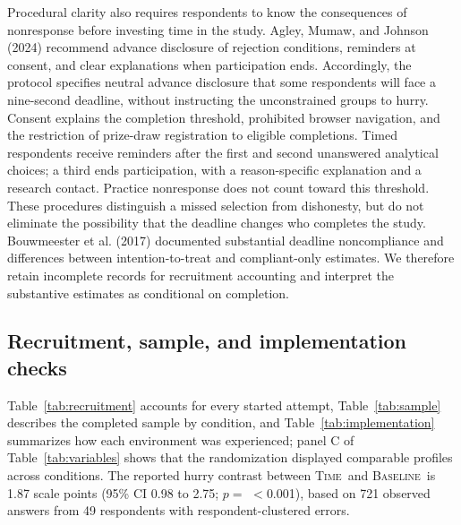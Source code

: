 \documentclass[11pt]{article}\usepackage[]{graphicx}\usepackage[]{xcolor}
\newcommand{\armT}{\textsc{Time}}
\newcommand{\armB}{\textsc{Baseline}}
\begin{document}
Procedural clarity also requires respondents to know the consequences of nonresponse before investing time in the study. Agley, Mumaw, and Johnson (2024) recommend advance disclosure of rejection conditions, reminders at consent, and clear explanations when participation ends. Accordingly, the protocol specifies neutral advance disclosure that some respondents will face a nine-second deadline, without instructing the unconstrained groups to hurry. Consent explains the completion threshold, prohibited browser navigation, and the restriction of prize-draw registration to eligible completions. Timed respondents receive reminders after the first and second unanswered analytical choices; a third ends participation, with a reason-specific explanation and a research contact. Practice nonresponse does not count toward this threshold. These procedures distinguish a missed selection from dishonesty, but do not eliminate the possibility that the deadline changes who completes the study. Bouwmeester et al. (2017) documented substantial deadline noncompliance and differences between intention-to-treat and compliant-only estimates. We therefore retain incomplete records for recruitment accounting and interpret the substantive estimates as conditional on completion.


\subsection{Recruitment, sample, and implementation checks}

Table~\ref{tab:recruitment} accounts for every started attempt, Table~\ref{tab:sample} describes the completed sample by condition, and Table~\ref{tab:implementation} summarizes how each environment was experienced; panel C of Table~\ref{tab:variables} shows that the randomization displayed comparable profiles across conditions. The reported hurry contrast between \armT\ and \armB\ is 1.87 scale points (95\% CI 0.98 to 2.75; $p=$ $<$0.001), based on 721 observed answers from 49 respondents with respondent-clustered errors.
\end{document}
